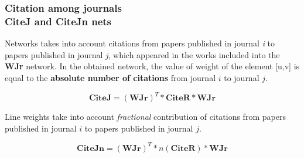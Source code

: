 \documentclass[hyperref={pdfstartview={FitBH -32768},
                         pdfpagemode=FullScreen,
                         plainpages=false,
                         colorlinks=true}
              ]{beamer}
\begin{document}

\begin{frame}[fragile]
\frametitle{Citation among journals\\ \normalsize CiteJ and CiteJn nets}

\footnotesize
Networks takes into account citations from papers published in journal \textit{i} to papers published in journal \textit{j}, which appeared in the works included into the \textbf{WJr} network. In the obtained network, the value of weight of the element [u,v] is equal to the \textbf{absolute number of citations} from journal $i$ to journal $j$. \smallskip

\[ \mathbf{CiteJ} = (\mathbf{WJr}) ^ T * \mathbf{CiteR} * \mathbf{WJr} \] 

Line weights take into account \textit{fractional} contribution of citations from papers published in journal $i$ to papers published in journal $j$. \medskip 

\[ \mathbf{CiteJn} = (\mathbf{WJr}) ^ T * n(\mathbf{CiteR}) * \mathbf{WJr} \]  


\end{frame}
\end{document}
